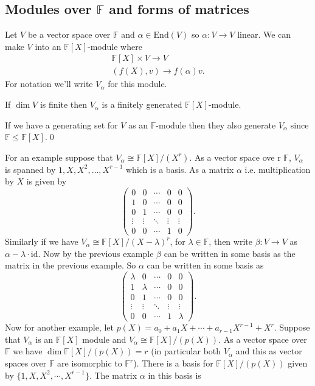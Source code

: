 \documentclass{article}
\newcommand{\F}{\mathbb{F}}
\begin{document}
\subsection{Modules over $ \F $ and forms of matrices}
Let $ V $ be a vector space over $ \F $ and $ \alpha\in\mathrm{End}(V) $ so $ \alpha:V\to V $ linear. We can make $ V $ into an $ \F[X] $-module where
\begin{align*}
	\F[X]\times V\to V \\
	(f(X), v)\to f(\alpha)v.
\end{align*}
For notation we'll write $ V_\alpha $ for this module.
\begin{lemma}
	If $ \dim V $ is finite then $ V_\alpha $ is a finitely generated $ \F[X] $-module.
\end{lemma}
If we have a generating set for $ V $ as an $ \F $-module then they also generate $ V_\alpha $ since $ \F\le \F[X] $.\qed
\par
For an example suppose that $ V_\alpha\cong \F[X]/(X^r) $. As a vector space ove r $ \F $, $ V_\alpha $ is spanned by $ 1,X,X^2,\dots, X^{r-1} $ which is a basis. As a matrix $ \alpha $ i.e. multiplication by $ X $ is given by
\[
  \begin{pmatrix}
	  0 & 0 & \cdots & 0 & 0 \\
	  1 & 0 & \cdots & 0 & 0 \\
	  0 & 1 & \cdots & 0 & 0 \\
	  \vdots & \vdots & \ddots & \vdots & \vdots \\
	  0 & 0 & \cdots & 1 & 0
  \end{pmatrix}.
\]
Similarly if we have $ V_\alpha\cong \F[X]/(X-\lambda)^r $, for $ \lambda\in \F $, then write $ \beta:V\to V $ as $ \alpha-\lambda\cdot \mathrm{id} $. Now by the previous example $ \beta $ can be written in some basis as the matrix in the previous example. So $ \alpha $ can be written in some basis as
\[
  \begin{pmatrix}
	  \lambda & 0 & \cdots & 0 & 0 \\
	  1 & \lambda & \cdots & 0 & 0 \\
	  0 & 1 & \cdots & 0 & 0 \\
	  \vdots & \vdots & \ddots & \vdots & \vdots \\
	  0 & 0 & \cdots & 1 & \lambda
  \end{pmatrix}.
\]
Now for another example, let $ p(X) = a_0 + a_1X+\cdots +a_{r-1}X^{r-1} + X^r$. Suppose that $ V_\alpha $ is an $ \F[X] $ module and $ V_\alpha\cong \F[X]/(p(X)) $. As a vector space over $ \F $ we have $ \dim \F[X]/(p(X)) = r $ (in particular both $ V_\alpha $ and this as vector spaces over $ \F $ are isomorphic to $ \F^r $). There is a basis for $ \F[X]/(p(X)) $ given by $ \{1,X,X^2,\cdots,X^{r-1}\} $. The matrix $ \alpha $ in this basis is
\end{document}

